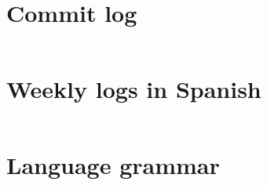 \documentclass[11pt]{scrreprt}
\begin{document}
\appendix

\chapter{Commit log}
\label{apdx:commits}
\inputminted{text}{/home/mario/git/MarioJim/miniclj/docs/commits.txt}

\chapter{Weekly logs in Spanish}
\label{apdx:weeklylogs}
\inputminted[breaklines=true]{md}{/home/mario/git/MarioJim/miniclj/docs/logs.md}

\chapter{Language grammar}
\label{apdx:grammar}
\inputminted{rust}{/home/mario/git/MarioJim/miniclj/miniclj-lib/src/parsers/lispparser.lalrpop}
\end{document}
